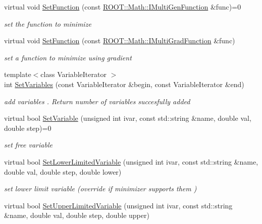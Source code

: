 \begin{DoxyCompactItemize}
virtual void \mbox{\hyperlink{classROOT_1_1Math_1_1Minimizer_a4391c613ab0c3f9777e56b487ffa5eac}{Set\+Function}} (const \mbox{\hyperlink{namespaceROOT_1_1Math_aec22897f3d759f7c284893c81d980799}{R\+O\+O\+T\+::\+Math\+::\+I\+Multi\+Gen\+Function}} \&func)=0
\begin{DoxyCompactList}\small\item\em set the function to minimize \end{DoxyCompactList}\item 
virtual void \mbox{\hyperlink{classROOT_1_1Math_1_1Minimizer_a1d9ff15aa732e518a60a05dcbd82c34a}{Set\+Function}} (const \mbox{\hyperlink{namespaceROOT_1_1Math_a014e019aaf9304a00e9231bd9ed232fb}{R\+O\+O\+T\+::\+Math\+::\+I\+Multi\+Grad\+Function}} \&func)
\begin{DoxyCompactList}\small\item\em set a function to minimize using gradient \end{DoxyCompactList}\item 
{\footnotesize template$<$class Variable\+Iterator $>$ }\\int \mbox{\hyperlink{classROOT_1_1Math_1_1Minimizer_a314040274ee907fba52726275a28c9f7}{Set\+Variables}} (const Variable\+Iterator \&begin, const Variable\+Iterator \&end)
\begin{DoxyCompactList}\small\item\em add variables . Return number of variables succesfully added \end{DoxyCompactList}\item 
virtual bool \mbox{\hyperlink{classROOT_1_1Math_1_1Minimizer_a8661a2ac86372602f32f97b3d9262421}{Set\+Variable}} (unsigned int ivar, const std\+::string \&name, double val, double step)=0
\begin{DoxyCompactList}\small\item\em set free variable \end{DoxyCompactList}\item 
virtual bool \mbox{\hyperlink{classROOT_1_1Math_1_1Minimizer_a0fed20bdc58d05ce2b92d2bf47594dfb}{Set\+Lower\+Limited\+Variable}} (unsigned int ivar, const std\+::string \&name, double val, double step, double lower)
\begin{DoxyCompactList}\small\item\em set lower limit variable (override if minimizer supports them ) \end{DoxyCompactList}\item 
virtual bool \mbox{\hyperlink{classROOT_1_1Math_1_1Minimizer_a804843fbaea82809b3c54232d0c1fe86}{Set\+Upper\+Limited\+Variable}} (unsigned int ivar, const std\+::string \&name, double val, double step, double upper)

\end{DoxyCompactItemize}
